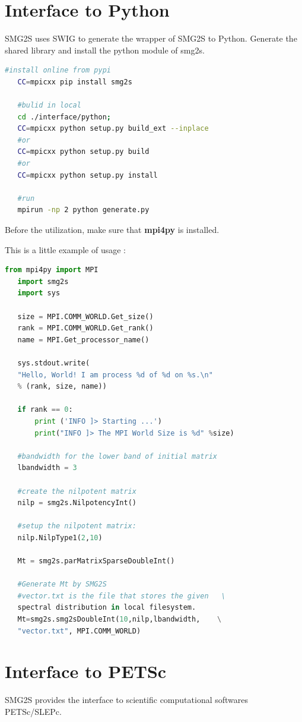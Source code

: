 \documentclass[a4paper, 10 pt]{report}
\begin{document}
	\section{Interface to Python}
	
	SMG2S uses SWIG to generate the wrapper of SMG2S to Python. Generate the shared library and install the python module of smg2s.
	\begin{lstlisting}[language=bash,frame=single]
   #install online from pypi
   CC=mpicxx pip install smg2s
	
   #bulid in local
   cd ./interface/python;
   CC=mpicxx python setup.py build_ext --inplace
   #or
   CC=mpicxx python setup.py build
   #or
   CC=mpicxx python setup.py install

   #run
   mpirun -np 2 python generate.py
	\end{lstlisting}
	
	Before the utilization, make sure that \textbf{mpi4py} is installed.
	
   This is	a little example of usage :
	\begin{lstlisting}[language=Python,frame=single]
   from mpi4py import MPI
   import smg2s
   import sys

   size = MPI.COMM_WORLD.Get_size()
   rank = MPI.COMM_WORLD.Get_rank()
   name = MPI.Get_processor_name()

   sys.stdout.write(
   "Hello, World! I am process %d of %d on %s.\n"
   % (rank, size, name))

   if rank == 0:
       print ('INFO ]> Starting ...')
       print("INFO ]> The MPI World Size is %d" %size)

   #bandwidth for the lower band of initial matrix
   lbandwidth = 3

   #create the nilpotent matrix
   nilp = smg2s.NilpotencyInt()

   #setup the nilpotent matrix:
   nilp.NilpType1(2,10)

   Mt = smg2s.parMatrixSparseDoubleInt()

   #Generate Mt by SMG2S
   #vector.txt is the file that stores the given   \
   spectral distribution in local filesystem.
   Mt=smg2s.smg2sDoubleInt(10,nilp,lbandwidth,    \
   "vector.txt", MPI.COMM_WORLD)
	\end{lstlisting}
	\section{Interface to PETSc}
	
	SMG2S provides the interface to scientific computational softwares PETSc/SLEPc.
	
\end{document}
